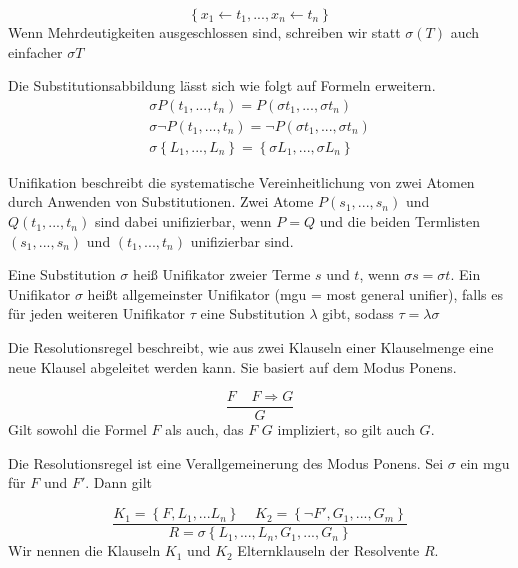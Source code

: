 \begin{equation}
  \left \{ x_1 \leftarrow t_1, ... , x_n \leftarrow t_n \right \}
\end{equation}
\noindent
Wenn Mehrdeutigkeiten ausgeschlossen sind, schreiben wir statt $\sigma(T)$ auch einfacher $\sigma T$

Die Substitutionsabbildung lässt sich wie folgt auf Formeln erweitern.
\begin{eqnarray}
  \sigma P(t_1,...,t_n) = P(\sigma t_1,...,\sigma t_n) \\
  \sigma \neg P(t_1,...,t_n) = \neg P(\sigma t_1,...,\sigma t_n) \\
  \sigma \left \{ L_1,...,L_n \right \} = \left \{ \sigma L_1,..., \sigma L_n \right \}
\end{eqnarray}

Unifikation beschreibt die systematische Vereinheitlichung von zwei Atomen durch Anwenden von Substitutionen. Zwei Atome $P(s_1,...,s_n)$ und $Q(t_1,...,t_n)$ sind dabei unifizierbar, wenn $P = Q$ und die beiden Termlisten $(s_1,...,s_n)$ und $(t_1,...,t_n)$ unifizierbar sind.

\begin{leftbar}
  \begin{definition}[Unifikator]
    \newline
    Eine Substitution $\sigma$ heiß Unifikator zweier Terme $s$ und $t$, wenn $\sigma s = \sigma t$.
    \newline
    Ein Unifikator $\sigma$ heißt allgemeinster Unifikator (mgu = most general unifier), falls es für jeden weiteren Unifikator $\tau$ eine Substitution $\lambda$ gibt, sodass $\tau = \lambda \sigma$
  \end{definition}
\end{leftbar}

Die Resolutionsregel beschreibt, wie aus zwei Klauseln einer Klauselmenge eine neue Klausel abgeleitet werden kann. Sie basiert auf dem Modus Ponens.

\begin{equation}
  \frac{F \;\; \; \;  F \Rightarrow G }{G}
\end{equation}
\noindent
Gilt sowohl die Formel $F$ als auch, das $F$ $G$ impliziert, so gilt auch $G$.

Die Resolutionsregel ist eine Verallgemeinerung des Modus Ponens. Sei $\sigma$ ein mgu für $F$ und $F'$. Dann gilt

\begin{equation}
  \frac{K_1 = \left \{ F ,L_1,...L_n \right \} \;\; \; \;  K_2 = \left \{ \neg F' ,G_1,...,G_m \right \} }{R = \sigma \left \{ L_1,...,L_n,G_1,...,G_n \right \}}
\end{equation}
\noindent
Wir nennen die Klauseln $K_1$ und $K_2$ Elternklauseln der Resolvente $R$.

